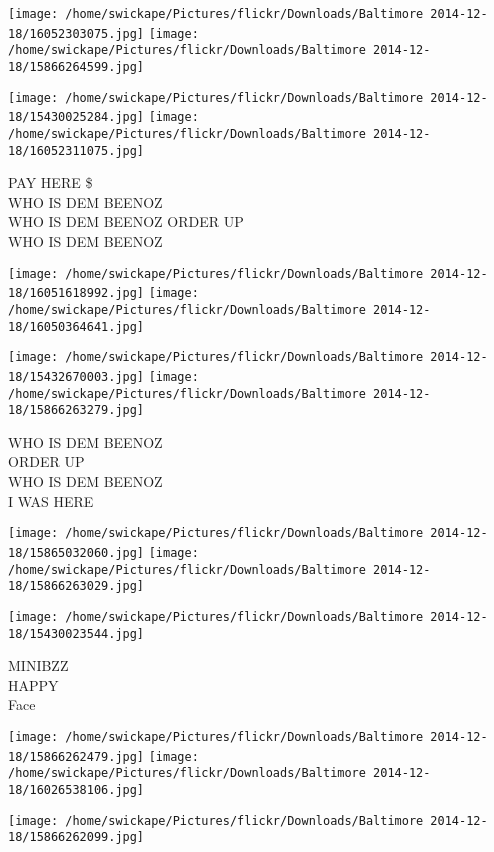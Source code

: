 \documentclass[10pt,letterpaper]{article}
\begin{document}
\texttt{[image: /home/swickape/Pictures/flickr/Downloads/Baltimore 2014-12-18/16052303075.jpg]}
\texttt{[image: /home/swickape/Pictures/flickr/Downloads/Baltimore 2014-12-18/15866264599.jpg]}

\texttt{[image: /home/swickape/Pictures/flickr/Downloads/Baltimore 2014-12-18/15430025284.jpg]}
\texttt{[image: /home/swickape/Pictures/flickr/Downloads/Baltimore 2014-12-18/16052311075.jpg]}

PAY HERE \$\\
WHO IS DEM BEENOZ\\
WHO IS DEM BEENOZ ORDER UP\\
WHO IS DEM BEENOZ\\
\pagebreak

\texttt{[image: /home/swickape/Pictures/flickr/Downloads/Baltimore 2014-12-18/16051618992.jpg]}
\texttt{[image: /home/swickape/Pictures/flickr/Downloads/Baltimore 2014-12-18/16050364641.jpg]}

\texttt{[image: /home/swickape/Pictures/flickr/Downloads/Baltimore 2014-12-18/15432670003.jpg]}
\texttt{[image: /home/swickape/Pictures/flickr/Downloads/Baltimore 2014-12-18/15866263279.jpg]}

WHO IS DEM BEENOZ\\
ORDER UP\\
WHO IS DEM BEENOZ\\
I WAS HERE\\
\pagebreak

\texttt{[image: /home/swickape/Pictures/flickr/Downloads/Baltimore 2014-12-18/15865032060.jpg]}
\texttt{[image: /home/swickape/Pictures/flickr/Downloads/Baltimore 2014-12-18/15866263029.jpg]}

\vspace{0.25in}
\texttt{[image: /home/swickape/Pictures/flickr/Downloads/Baltimore 2014-12-18/15430023544.jpg]}

MINIBZZ\\
HAPPY\\
Face\\
\pagebreak

\texttt{[image: /home/swickape/Pictures/flickr/Downloads/Baltimore 2014-12-18/15866262479.jpg]}
\texttt{[image: /home/swickape/Pictures/flickr/Downloads/Baltimore 2014-12-18/16026538106.jpg]}

\vspace{0.25in}
\texttt{[image: /home/swickape/Pictures/flickr/Downloads/Baltimore 2014-12-18/15866262099.jpg]}
\end{document}
